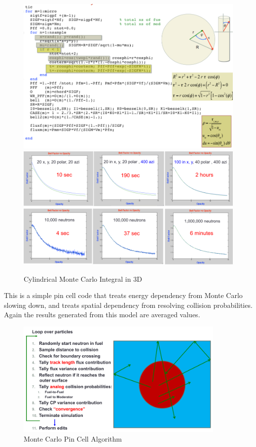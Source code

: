 \documentclass{school-22.211-notes}
\begin{document}
\clearpage
{}
\begin{figure}[h]
  \centering
  \includegraphics[width=5in]{images/pin/cylinder-mc-1.png}
  \includegraphics[width=5in]{images/pin/cylinder-mc-2.png}
  \caption{Cylindrical Monte Carlo Integral in 3D} 
\end{figure}



\clearpage
{}
This is a simple pin cell code that treats energy dependency from Monte Carlo slowing down, and treats spatial dependency from resolving collision probabilities. Again the results generated from this model are averaged values. 

\begin{figure}[h]
  \centering
  \includegraphics[width=4in]{images/pin/MC-pincell.png}
  \caption{Monte Carlo Pin Cell Algorithm}
\end{figure}
\end{document}
